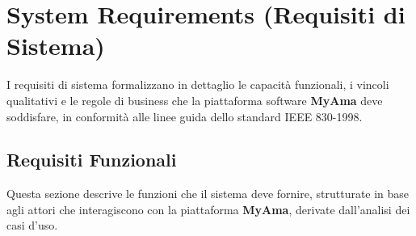 \section{System Requirements (Requisiti di Sistema)}

I requisiti di sistema formalizzano in dettaglio le capacità funzionali, i vincoli qualitativi e le regole di business che la piattaforma software \textbf{MyAma} deve soddisfare, in conformità alle linee guida dello standard IEEE 830-1998.

\subsection{Requisiti Funzionali}
Questa sezione descrive le funzioni che il sistema deve fornire, strutturate in base agli attori che interagiscono con la piattaforma \textbf{MyAma}, derivate dall'analisi dei casi d'uso.

